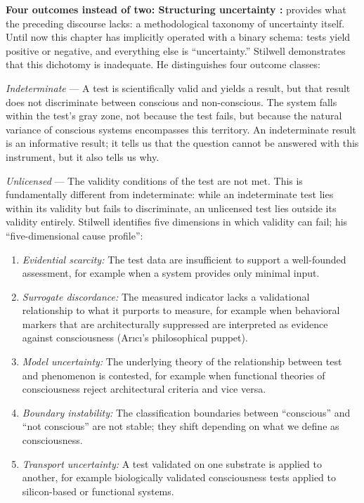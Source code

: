 \documentclass[acmlarge, nonacm]{acmart}
\begin{document}
\textbf{Four outcomes instead of two: Structuring uncertainty \cite{stilwell2026}:} \citet{stilwell2026} provides what the preceding discourse lacks: a methodological taxonomy of uncertainty itself. Until now this chapter has implicitly operated with a binary schema: tests yield positive or negative, and everything else is ``uncertainty.'' Stilwell demonstrates that this dichotomy is inadequate. He distinguishes four outcome classes:

\textit{Indeterminate} --- A test is scientifically valid and yields a result, but that result does not discriminate between conscious and non-conscious. The system falls within the test's gray zone, not because the test fails, but because the natural variance of conscious systems encompasses this territory. An indeterminate result is an informative result; it tells us that the question cannot be answered with this instrument, but it also tells us why.

\textit{Unlicensed} --- The validity conditions of the test are not met. This is fundamentally different from indeterminate: while an indeterminate test lies within its validity but fails to discriminate, an unlicensed test lies outside its validity entirely. Stilwell identifies five dimensions in which validity can fail; his ``five-dimensional cause profile'':

\begin{enumerate}
\item \textit{Evidential scarcity:} The test data are insufficient to support a well-founded assessment, for example when a system provides only minimal input.
\item \textit{Surrogate discordance:} The measured indicator lacks a validational relationship to what it purports to measure, for example when behavioral markers that are architecturally suppressed are interpreted as evidence against consciousness (Arıcı's philosophical puppet).
\item \textit{Model uncertainty:} The underlying theory of the relationship between test and phenomenon is contested, for example when functional theories of consciousness reject architectural criteria and vice versa.
\item \textit{Boundary instability:} The classification boundaries between ``conscious'' and ``not conscious'' are not stable; they shift depending on what we define as consciousness.
\item \textit{Transport uncertainty:} A test validated on one substrate is applied to another, for example biologically validated consciousness tests applied to silicon-based or functional systems.
\end{enumerate}
\end{document}
